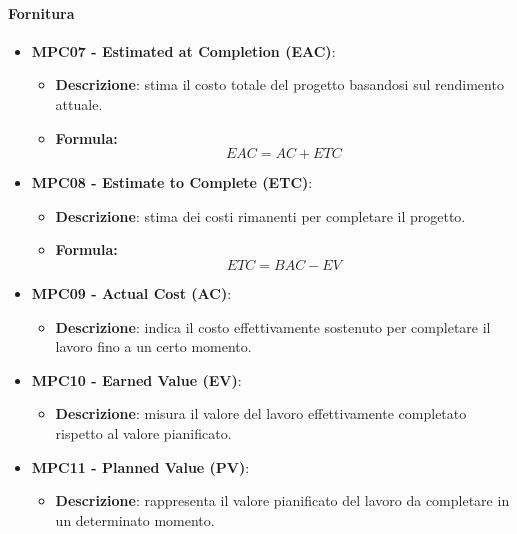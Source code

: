 \documentclass[10pt]{article}
\begin{document}
\begin{justify}
\paragraph{Fornitura}
\begin{itemize}
    \item \textbf{MPC07 - Estimated at Completion (EAC)}:
    \begin{itemize}
        \item   \textbf{Descrizione}: stima il costo totale del progetto basandosi sul rendimento attuale.
        \item   \textbf{Formula:}
                \[
                EAC = AC + ETC
                \]
    \end{itemize}
    \item \textbf{MPC08 - Estimate to Complete (ETC)}:
    \begin{itemize}
        \item   \textbf{Descrizione}: stima dei costi rimanenti per completare il progetto.
        \item   \textbf{Formula:}
                \[
                ETC = BAC - EV
                \]
    \end{itemize}
    \item \textbf{MPC09 - Actual Cost (AC)}:
    \begin{itemize}
        \item \textbf{Descrizione}: indica il costo effettivamente sostenuto per completare il lavoro fino a un certo momento.
    \end{itemize}
    \item \textbf{MPC10 - Earned Value (EV)}:
        \begin{itemize}
            \item \textbf{Descrizione}: misura il valore del lavoro effettivamente completato rispetto al valore pianificato.
        \end{itemize}
    \item \textbf{MPC11 - Planned Value (PV)}:
        \begin{itemize}
            \item \textbf{Descrizione}: rappresenta il valore pianificato del lavoro da completare in un determinato momento.
        \end{itemize}
\end{itemize}


\end{justify}
\end{document}
